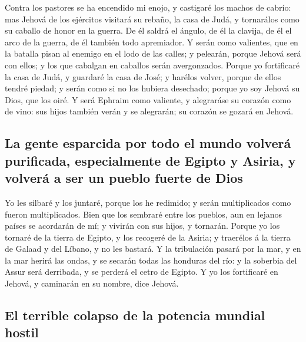  Contra los pastores se ha encendido mi enojo, y castigaré
los machos de cabrío: mas Jehová de los ejércitos visitará su rebaño, la
casa de Judá, y tornarálos como su caballo de honor en la guerra.
 De él saldrá el ángulo, de él la clavija, de él el arco de
la guerra, de él también todo apremiador.  Y serán como
valientes, que en la batalla pisan al enemigo en el lodo de las calles;
y pelearán, porque Jehová será con ellos; y los que cabalgan en caballos
serán avergonzados.  Porque yo fortificaré la casa de Judá,
y guardaré la casa de José; y harélos volver, porque de ellos tendré
piedad; y serán como si no los hubiera desechado; porque yo soy Jehová
su Dios, que los oiré.  Y será Ephraim como valiente, y
alegraráse su corazón como de vino: sus hijos también verán y se
alegrarán; su corazón se gozará en Jehová.

\hypertarget{la-gente-esparcida-por-todo-el-mundo-volveruxe1-purificada-especialmente-de-egipto-y-asiria-y-volveruxe1-a-ser-un-pueblo-fuerte-de-dios}{%
\subsection{La gente esparcida por todo el mundo volverá purificada,
especialmente de Egipto y Asiria, y volverá a ser un pueblo fuerte de
Dios}\label{la-gente-esparcida-por-todo-el-mundo-volveruxe1-purificada-especialmente-de-egipto-y-asiria-y-volveruxe1-a-ser-un-pueblo-fuerte-de-dios}}

 Yo les silbaré y los juntaré, porque los he redimido; y
serán multiplicados como fueron multiplicados.  Bien que los
sembraré entre los pueblos, aun en lejanos países se acordarán de mí; y
vivirán con sus hijos, y tornarán.  Porque yo los tornaré
de la tierra de Egipto, y los recogeré de la Asiria; y traerélos á la
tierra de Galaad y del Líbano, y no les bastará.  Y la
tribulación pasará por la mar, y en la mar herirá las ondas, y se
secarán todas las honduras del río: y la soberbia del Assur será
derribada, y se perderá el cetro de Egipto.  Y yo los
fortificaré en Jehová, y caminarán en su nombre, dice Jehová.

\hypertarget{el-terrible-colapso-de-la-potencia-mundial-hostil}{%
\subsection{El terrible colapso de la potencia mundial
hostil}\label{el-terrible-colapso-de-la-potencia-mundial-hostil}}

